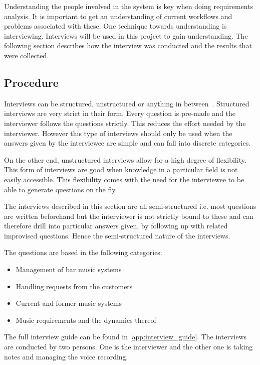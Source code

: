 \label{interviews}

Understanding the people involved in the system is key when doing requirements analysis. It is important to get an understanding of current workflows and problems associated with these. One technique towards understanding is interviewing. Interviews will be used in this project to gain understanding. The following section describes how the interview was conducted and the results that were collected.

\subsection{Procedure}
\label{sub:procedure}

Interviews can be structured, unstructured or anything in between~\cite{benyon2013designing}. Structured interviews are very strict in their form. Every question is pre-made and the interviewer follows the questions strictly. This reduces the effort needed by the interviewer. However this type of interviews should only be used when the answers given by the interviewee are simple and can fall into discrete categories.

On the other end, unstructured interviews allow for a high degree of flexibility. This form of interviews are good when knowledge in a particular field is not easily accessible. This flexibility comes with the need for the interviewee to be able to generate questions on the fly.

The interviews described in this section are all semi-structured i.e. most questions are written beforehand but the interviewer is not strictly bound to these and can therefore drill into particular answers given, by following up with related improvised questions. Hence the semi-structured nature of the interviews.

The questions are based in the following categories:

\begin{itemize}
  \item Management of bar music systems
  \item Handling requests from the customers
  \item Current and former music systems
  \item Music requirements and the dynamics thereof
\end{itemize}

The full interview guide can be found in \cref{app:interview_guide}. The interviews are conducted by two persons. One is the interviewer and the other one is taking notes and managing the voice recording.

